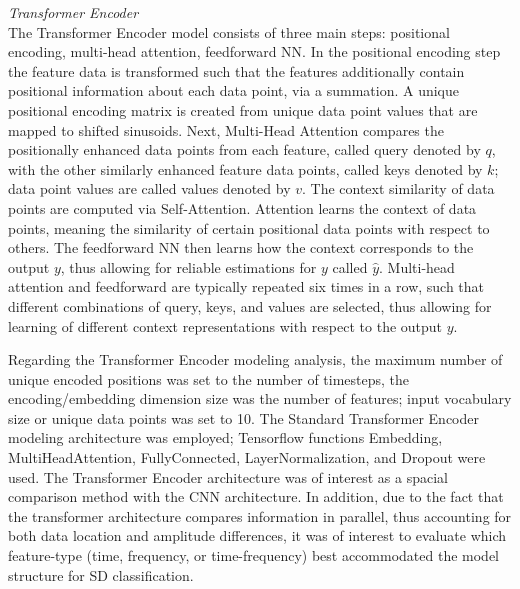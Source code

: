 \documentclass{ieeeaccess}
\begin{document}
\noindent \emph{Transformer Encoder}\\
The Transformer Encoder model consists of three main steps: positional encoding, multi-head attention, feedforward NN.
In the positional encoding step the feature data is transformed such that the features additionally contain positional information about each data point, via a summation. A unique positional encoding matrix is created from unique data point values that are mapped to shifted sinusoids. Next, Multi-Head Attention compares the positionally enhanced data points from each feature, called query denoted by $q$, with the other similarly enhanced feature data points, called keys denoted by $k$; data point values are called values denoted by $v$. The context similarity of data points are computed via Self-Attention. Attention learns the context of data points, meaning the similarity of certain positional data points with respect to others. The feedforward NN then learns how the context corresponds to the output $y$, thus allowing for reliable estimations for $y$ called $\hat{y}$. Multi-head attention and feedforward are typically repeated six times in a row, such that different combinations of query, keys, and values are selected, thus allowing for learning of different context representations with respect to the output $y$\cite{Ng_2021_Deep_learning_specialization, Sarang_2021_Tensorflow2}. 

Regarding the Transformer Encoder modeling analysis, the maximum number of unique encoded positions was set to the number of timesteps, the encoding/embedding dimension size was the number of features; input vocabulary size or unique data points was set to 10. The Standard Transformer Encoder modeling architecture was employed; Tensorflow functions Embedding, MultiHeadAttention, FullyConnected, LayerNormalization, and Dropout were used. The Transformer Encoder architecture was of interest as a spacial comparison method with the CNN architecture. In addition, due to the fact that the transformer architecture compares information in parallel, thus accounting for both data location and amplitude differences, it was of interest to evaluate which feature-type (time, frequency, or time-frequency) best accommodated the model structure for SD classification.\\
\end{document}
